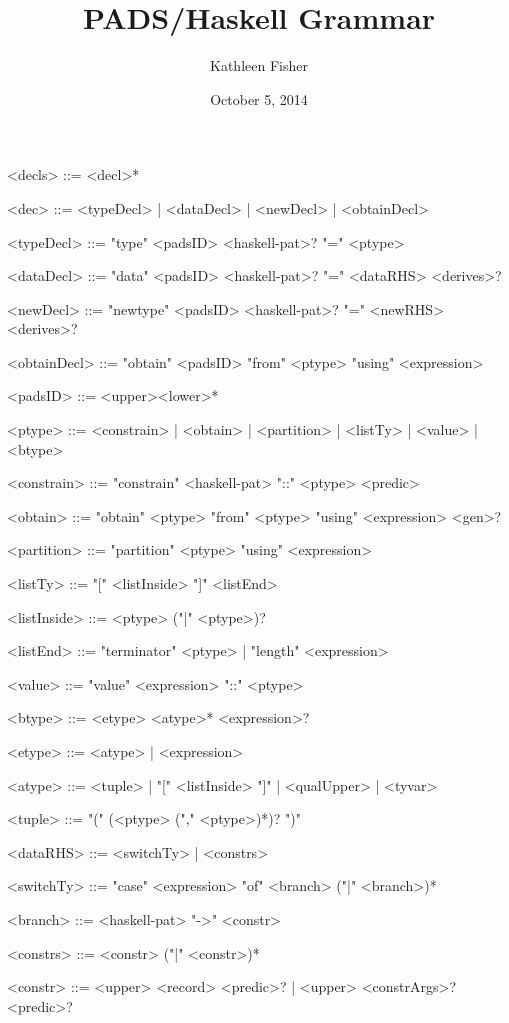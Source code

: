 \documentclass{article}
\title{ PADS/Haskell Grammar}
\author{Kathleen Fisher}
\date{October 5, 2014}
\begin{document}
\maketitle
\thispagestyle{empty}

\begin{grammar}
<decls> ::= <decl>*

<dec>        ::= <typeDecl> | <dataDecl> | <newDecl> | <obtainDecl>

<typeDecl>   ::= "type" <padsID> <haskell-pat>? "=" <ptype>

<dataDecl>   ::= "data" <padsID> <haskell-pat>? "=" <dataRHS> <derives>?

<newDecl>    ::= "newtype" <padsID> <haskell-pat>? "=" <newRHS> <derives>?

<obtainDecl> ::= "obtain" <padsID> "from" <ptype> "using" <expression>

<padsID>     ::= <upper><lower>*

<ptype>      ::= <constrain> | <obtain> | <partition> | <listTy> | <value> | <btype>

<constrain>  ::= "constrain" <haskell-pat> "::" <ptype> <predic>

<obtain>     ::= "obtain" <ptype> "from" <ptype> "using" <expression> <gen>?

<partition>  ::= "partition" <ptype> "using" <expression>

<listTy>     ::= "[" <listInside> "]" <listEnd>

<listInside> ::= <ptype> ("|" <ptype>)?

<listEnd>    ::= "terminator" <ptype> | "length" <expression>

<value>      ::= "value" <expression> "::" <ptype>

<btype>      ::= <etype> <atype>* <expression>?

<etype>      ::= <atype> | <expression>

<atype>      ::= <tuple> | "[" <listInside> "]" | <qualUpper> | <tyvar>

<tuple>      ::= "(" (<ptype> ("," <ptype>)*)? ")"

<dataRHS>    ::= <switchTy> | <constrs>
 
<switchTy>   ::= "case" <expression> "of" <branch> ("|" <branch>)*

<branch>     ::= <haskell-pat> "->" <constr>

<constrs>    ::= <constr> ("|" <constr>)*

<constr>     ::= <upper> <record> <predic>? | <upper> <constrArgs>? <predic>?


\end{grammar}
\end{document}
